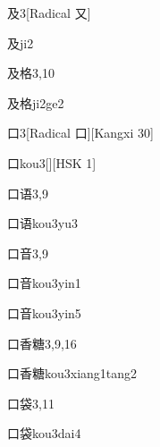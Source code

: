 \begin{entry}{及}{3}[Radical 又]
  \begin{phonetics}{及}{ji2}
  \end{phonetics}
\end{entry}

\begin{entry}{及格}{3,10}
  \begin{phonetics}{及格}{ji2ge2}
  \end{phonetics}
\end{entry}

\begin{entry}{口}{3}[Radical 口][Kangxi 30]
  \begin{phonetics}{口}{kou3}[][HSK 1]
  \end{phonetics}
\end{entry}

\begin{entry}{口语}{3,9}
  \begin{phonetics}{口语}{kou3yu3}
  \end{phonetics}
\end{entry}

\begin{entry}{口音}{3,9}
  \begin{phonetics}{口音}{kou3yin1}
  \end{phonetics}
  \begin{phonetics}{口音}{kou3yin5}
  \end{phonetics}
\end{entry}

\begin{entry}{口香糖}{3,9,16}
  \begin{phonetics}{口香糖}{kou3xiang1tang2}
  \end{phonetics}
\end{entry}

\begin{entry}{口袋}{3,11}
  \begin{phonetics}{口袋}{kou3dai4}
  \end{phonetics}
\end{entry}


